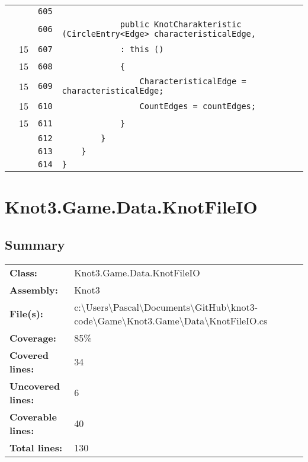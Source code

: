 \documentclass[a4paper,10pt]{article}
\begin{document}
\begin{longtable}[l]{lrrl}
\cellcolor{gray} &  & \verb~605~ & \verb~~\\
\cellcolor{gray} &  & \verb~606~ & \verb~            public KnotCharakteristic (CircleEntry<Edge> characteristicalEdge,~\\
\cellcolor{green} & 15 & \verb~607~ & \verb~            : this ()~\\
\cellcolor{green} & 15 & \verb~608~ & \verb~            {~\\
\cellcolor{green} & 15 & \verb~609~ & \verb~                CharacteristicalEdge = characteristicalEdge;~\\
\cellcolor{green} & 15 & \verb~610~ & \verb~                CountEdges = countEdges;~\\
\cellcolor{green} & 15 & \verb~611~ & \verb~            }~\\
\cellcolor{gray} &  & \verb~612~ & \verb~        }~\\
\cellcolor{gray} &  & \verb~613~ & \verb~    }~\\
\cellcolor{gray} &  & \verb~614~ & \verb~}~\\
\end{longtable}
\newpage
\section{Knot3.Game.Data.KnotFileIO}
\subsection{Summary}
\begin{longtable}[l]{ll}
\textbf{Class:} & Knot3.Game.Data.KnotFileIO\\
\textbf{Assembly:} & Knot3\\
\textbf{File(s):} & \begin{minipage}[t]{12cm}{c:\textbackslash Users\textbackslash Pascal\textbackslash Documents\textbackslash GitHub\textbackslash knot3-code\textbackslash Game\textbackslash Knot3.Game\textbackslash Data\textbackslash KnotFileIO.cs}\end{minipage} \\
\textbf{Coverage:} & 85\%\\
\textbf{Covered lines:} & 34\\
\textbf{Uncovered lines:} & 6\\
\textbf{Coverable lines:} & 40\\
\textbf{Total lines:} & 130\\
\end{longtable}
\end{document}
